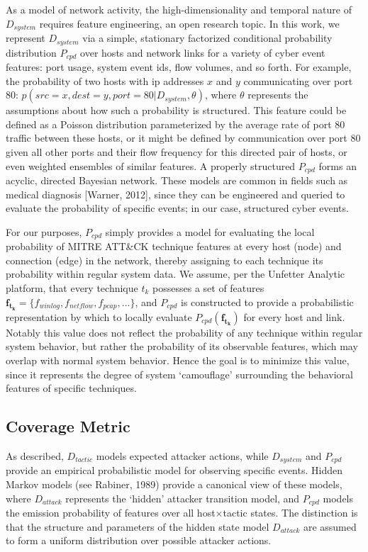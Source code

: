 \documentclass[journal]{IEEEtran}
\begin{document}
As a model of network activity, the high-dimensionality and temporal nature of $D_{system}$ requires feature engineering, an open research topic. In this work, we represent $D_{system}$ via a simple, stationary factorized conditional probability distribution $P_{cpd}$ over hosts and network links for a variety of cyber event features: port usage, system event ids, flow volumes, and so forth. For example, the probability of two hosts with ip addresses $x$ and $y$ communicating over port 80: $p(src=x,dest=y,port=80|D_{system},\theta)$, where $\theta$ represents the assumptions about how such a probability is structured. This feature could be defined as a Poisson distribution parameterized by the average rate of port 80 traffic between these hosts, or it might be defined by communication over port 80 given all other ports and their flow frequency for this directed pair of hosts, or even weighted ensembles of similar features. A properly structured $P_{cpd}$ forms an acyclic, directed Bayesian network. These models are common in fields such as medical diagnosis [Warner, 2012], since they can be engineered and queried to evaluate the probability of specific events; in our case, structured cyber events.

For our purposes, $P_{cpd}$ simply provides a model for evaluating the local probability of MITRE ATT\&CK technique features at every host (node) and connection (edge) in the network, thereby assigning to each technique its probability within regular system data. We assume, per the Unfetter Analytic platform, that every technique $t_{k}$ possesses a set of features $\mathbf{f_{t_{k}}}=\{f_{winlog},f_{netflow},f_{pcap},...\}$, and $P_{cpd}$ is constructed to provide a probabilistic representation by which to locally evaluate $P_{cpd}(\mathbf{f_{t_{k}}})$ for every host and link. Notably this value does not reflect the probability of any technique within regular system behavior, but rather the probability of its observable features, which may overlap with normal system behavior. Hence the goal is to minimize this value, since it represents the degree of system ‘camouflage’ surrounding the behavioral features of specific techniques.

\color{black}

\subsection{Coverage Metric}
\color{red}

As described, $D_{tactic}$ models expected attacker actions, while $D_{system}$ and $P_{cpd}$ provide an empirical probabilistic model for observing specific events. Hidden Markov models (see Rabiner, 1989) provide a canonical view of these models, where $D_{attack}$ represents the ‘hidden’ attacker transition model, and $P_{cpd}$ models the emission probability of features over all host$\times$tactic states. The distinction is that the structure and parameters of the hidden state model $D_{attack}$ are assumed to form a uniform distribution over possible attacker actions.
\end{document}
